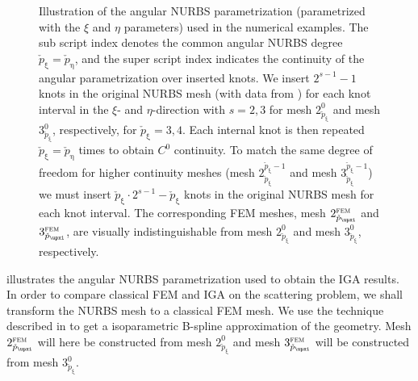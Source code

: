 \begin{figure}
	\caption{Illustration of the angular NURBS parametrization (parametrized with the $\xi$ and $\eta$ parameters) used in the numerical examples. The sub script index denotes the common angular NURBS degree $\check{p}_\upxi=\check{p}_\upeta$, and the super script index indicates the continuity of the angular parametrization over inserted knots. We insert $2^{s-1}-1$ knots in the original NURBS mesh (with data from ) for each knot interval in the $\xi$- and $\eta$-direction with $s=2,3$ for mesh $2_{\check{p}_\upxi}^0$ and mesh $3_{\check{p}_\upxi}^0$, respectively, for $\check{p}_\upxi=3,4$. Each internal knot is then repeated $\check{p}_\upxi=\check{p}_\upeta$ times to obtain $C^0$ continuity. To match the same degree of freedom for higher continuity meshes (mesh $2_{\check{p}_\upxi}^{\check{p}_\upxi-1}$ and mesh $3_{\check{p}_\upxi}^{\check{p}_\upxi-1}$) we must insert $\check{p}_\upxi\cdot 2^{s-1}-\check{p}_\upxi$ knots in the original NURBS mesh for each knot interval. The corresponding FEM meshes, mesh $2_{\check{p}_\upxi}^{\textsc{fem}}$ and $3_{\check{p}_\upxi}^{\textsc{fem}}$, are visually indistinguishable from mesh $2_{\check{p}_\upxi}^0$ and mesh $3_{\check{p}_\upxi}^0$, respectively.}
	\label{Fig2:SphericalShellMesh23_p}
\end{figure}

 illustrates the angular NURBS parametrization used to obtain the IGA results. In order to compare classical FEM and IGA on the scattering problem, we shall transform the NURBS mesh to a classical FEM mesh. We use the technique described in  to get a isoparametric B-spline approximation of the geometry. Mesh $2_{\check{p}_\upxi}^{\textsc{fem}}$ will here be constructed from mesh $2_{\check{p}_\upxi}^0$ and mesh $3_{\check{p}_\upxi}^{\textsc{fem}}$ will be constructed from mesh $3_{\check{p}_\upxi}^0$. 

